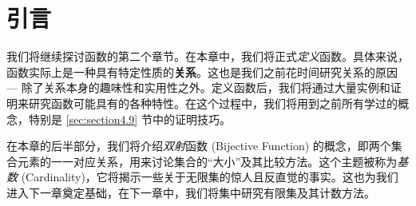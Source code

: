 
\section{引言}

我们将继续探讨函数的第二个章节。在本章中，我们将正式\emph{定义}函数。具体来说，函数实际上是一种具有特定性质的\textbf{关系}。这也是我们之前花时间研究关系的原因 --- 除了关系本身的趣味性和实用性之外。定义函数后，我们将通过大量实例和证明来研究函数可能具有的各种特性。在这个过程中，我们将用到之前所有学过的概念，特别是 \ref{sec:section4.9} 节中的证明技巧。

在本章的后半部分，我们将介绍\emph{双射}函数 (Bijective Function) 的概念，即两个集合元素的一一对应关系，用来讨论集合的``大小''及其比较方法。这个主题被称为\emph{基数} (Cardinality)，它将揭示一些关于无限集的惊人且反直觉的事实。这也为我们进入下一章奠定基础，在下一章中，我们将集中研究有限集及其计数方法。







